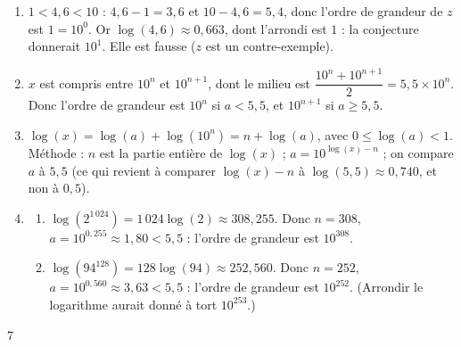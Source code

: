 {\begin{enumerate}
\begin{enumerate}[label=\alph*.]
  \item $\log(27{,}6)\approx1{,}441$ et $\log(812)\approx2{,}910$. Les arrondis à l'unité sont $1$ et $3$ : conjecture « l'ordre de grandeur de $x$ est $10^{k}$, où $k$ est l'arrondi à l'unité de $\log(x)$ ».
  \end{enumerate}
\item $1<4{,}6<10$ : $4{,}6-1=3{,}6$ et $10-4{,}6=5{,}4$, donc l'ordre de grandeur de $z$ est $1=10^0$. Or $\log(4{,}6)\approx0{,}663$, dont l'arrondi est $1$ : la conjecture donnerait $10^1$. Elle est fausse ($z$ est un contre-exemple).
\item $x$ est compris entre $10^n$ et $10^{n+1}$, dont le milieu est $\dfrac{10^n+10^{n+1}}2=5{,}5\times10^n$. Donc l'ordre de grandeur est $10^n$ si $a<5{,}5$, et $10^{n+1}$ si $a\geqslant5{,}5$.
\item $\log(x)=\log(a)+\log(10^n)=n+\log(a)$, avec $0\leqslant\log(a)<1$. Méthode : $n$ est la partie entière de $\log(x)$ ; $a=10^{\log(x)-n}$ ; on compare $a$ à $5{,}5$ (ce qui revient à comparer $\log(x)-n$ à $\log(5{,}5)\approx0{,}740$, et non à $0{,}5$).
\item
  \begin{enumerate}[label=\alph*.]
  \item $\log(2^{1\,024})=1\,024\log(2)\approx308{,}255$. Donc $n=308$, $a=10^{0{,}255}\approx1{,}80<5{,}5$ : l'ordre de grandeur est $10^{308}$.
  \item $\log(94^{128})=128\log(94)\approx252{,}560$. Donc $n=252$, $a=10^{0{,}560}\approx3{,}63<5{,}5$ : l'ordre de grandeur est $10^{252}$. (Arrondir le logarithme aurait donné à tort $10^{253}$.)
  \end{enumerate}
\end{enumerate}
}{7}

